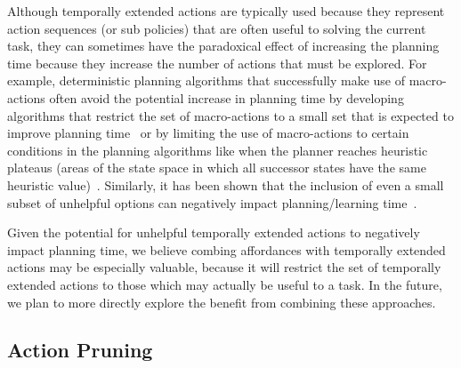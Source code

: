 \documentclass[]{article}
\newcommand{\jmnote}[1]{\textcolor{Green}{\textbf{JM: #1}}}
\begin{document}
Although temporally extended actions are typically used
because they represent action sequences (or sub policies) that are often useful to solving
the current task, they can sometimes have the paradoxical effect
of increasing the planning time because they increase the number of actions that must be explored.
For example, deterministic planning algorithms that successfully make use of macro-actions often avoid the potential increase
in planning time by developing algorithms that restrict the set of macro-actions to a small set that is expected to improve planning time~\citep{Botea:2005kx,Newton:2005vn} or by limiting the use of macro-actions to certain conditions
in the planning algorithms like when the planner reaches heuristic plateaus (areas of the state space in which all successor states have the same heuristic value)~\cite{Coles:2007ys}. Similarly, it has been shown that the inclusion
of even a small subset of unhelpful options can negatively impact planning/learning time~\cite{Jong:2008zr}.

Given the potential for unhelpful temporally extended actions to negatively impact planning time, we believe combing affordances with temporally extended actions
may be especially valuable, because it will restrict the set of temporally extended actions to those
which may actually be useful to a task. In the future, we plan to more directly explore the benefit from combining
these approaches.



\subsection{Action Pruning}
\end{document}
